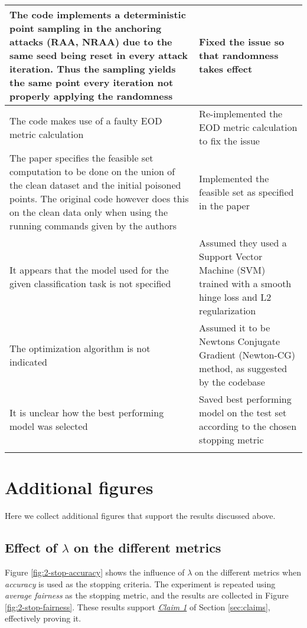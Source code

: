 {\begin{tabular}{p{8cm} p{8cm}}
 \midrule[0.05mm]
 The code implements a deterministic point sampling in the anchoring attacks (RAA, NRAA) due to the same seed being reset in every attack iteration. Thus the sampling yields the same point every iteration not properly applying the randomness&Fixed the issue so that randomness takes effect\\
 \midrule[0.05mm]
 The code makes use of a faulty EOD metric calculation&Re-implemented the EOD metric calculation to fix the issue\\
 \midrule[0.05mm]
 The paper specifies the feasible set computation to be done on the union of the clean dataset and the initial poisoned points. The original code however does this on the clean data only when using the running commands given by the authors&Implemented the feasible set as specified in the paper\\
 \midrule[0.05mm]
 It appears that the model used for the given classification task is not specified&Assumed they used a Support Vector Machine (SVM) trained with a smooth hinge loss and L2 regularization\\
 \midrule[0.05mm]
 The optimization algorithm is not indicated&Assumed it to be Newtons Conjugate Gradient (Newton-CG) method, as suggested by the codebase\\
 \midrule[0.05mm]
 It is unclear how the best performing model was selected&Saved best performing model on the test set according to the chosen stopping metric\\
 \bottomrule
\label{tab:inconsistencies}

\end{tabular}}


\section{Additional figures}
Here we collect additional figures that support the results discussed above.

\subsection{Effect of $\lambda$ on the different metrics}
\label{app:lambda}

Figure \ref{fig:2-stop-accuracy} shows the influence of $\lambda$ on the different metrics when \textit{accuracy} is used as the stopping criteria. The experiment is repeated using \textit{average fairness} as the stopping metric, and the results are collected in Figure \ref{fig:2-stop-fairness}. These results support \hyperlink{claim-1}{\textit{Claim 1}} of Section \ref{sec:claims}, effectively proving it.

